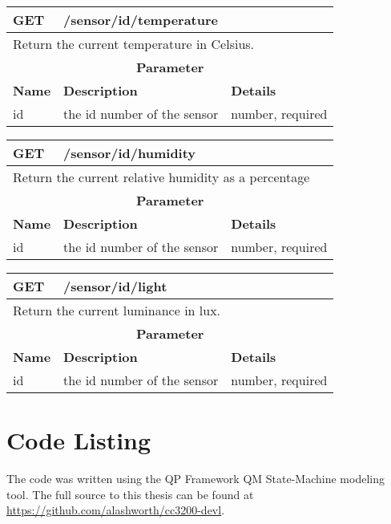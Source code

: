 \begin{table}[h]
\begin{tabular}{@{}lll@{}}
\toprule
\textbf{GET} & \multicolumn{2}{l}{/sensor/{id}/temperature} \\ \midrule
\multicolumn{3}{l}{Return the current temperature in Celsius.} \\
\multicolumn{3}{c}{\textbf{Parameter}} \\
\textbf{Name} & \textbf{Description} & \textbf{Details} \\
id & the id number of the sensor & number, required \\ \bottomrule
\end{tabular}
\end{table}
\begin{table}[h]
\begin{tabular}{@{}lll@{}}
\toprule
\textbf{GET} & \multicolumn{2}{l}{/sensor/{id}/humidity} \\ \midrule
\multicolumn{3}{l}{Return the current relative humidity as a percentage} \\
\multicolumn{3}{c}{\textbf{Parameter}} \\
\textbf{Name} & \textbf{Description} & \textbf{Details} \\
id & the id number of the sensor & number, required \\ \bottomrule
\end{tabular}
\end{table}
\begin{table}[h]
\begin{tabular}{@{}lll@{}}
\toprule
\textbf{GET} & \multicolumn{2}{l}{/sensor/{id}/light} \\ \midrule
\multicolumn{3}{l}{Return the current luminance in lux.} \\
\multicolumn{3}{c}{\textbf{Parameter}} \\
\textbf{Name} & \textbf{Description} & \textbf{Details} \\
id & the id number of the sensor & number, required \\ \bottomrule
\end{tabular}
\end{table}

\section*{Code Listing}

The code was written using the QP Framework QM State-Machine modeling tool. The full source to this thesis can be found at \url{https://github.com/alashworth/cc3200-devl}.